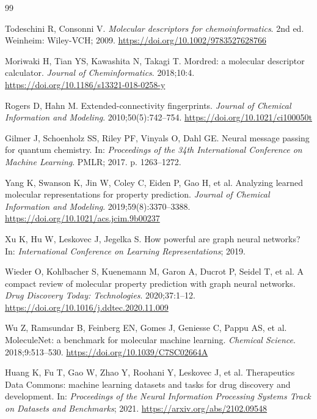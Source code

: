 ﻿\begin{thebibliography}{99}

Todeschini R, Consonni V. \emph{Molecular descriptors for chemoinformatics}. 2nd ed. Weinheim: Wiley-VCH; 2009. \url{https://doi.org/10.1002/9783527628766}

Moriwaki H, Tian YS, Kawashita N, Takagi T. Mordred: a molecular descriptor calculator. \emph{Journal of Cheminformatics}. 2018;10:4. \url{https://doi.org/10.1186/s13321-018-0258-y}

Rogers D, Hahn M. Extended-connectivity fingerprints. \emph{Journal of Chemical Information and Modeling}. 2010;50(5):742--754. \url{https://doi.org/10.1021/ci100050t}

Gilmer J, Schoenholz SS, Riley PF, Vinyals O, Dahl GE. Neural message passing for quantum chemistry. In: \emph{Proceedings of the 34th International Conference on Machine Learning}. PMLR; 2017. p. 1263--1272.

Yang K, Swanson K, Jin W, Coley C, Eiden P, Gao H, et al. Analyzing learned molecular representations for property prediction. \emph{Journal of Chemical Information and Modeling}. 2019;59(8):3370--3388. \url{https://doi.org/10.1021/acs.jcim.9b00237}

Xu K, Hu W, Leskovec J, Jegelka S. How powerful are graph neural networks? In: \emph{International Conference on Learning Representations}; 2019.

Wieder O, Kohlbacher S, Kuenemann M, Garon A, Ducrot P, Seidel T, et al. A compact review of molecular property prediction with graph neural networks. \emph{Drug Discovery Today: Technologies}. 2020;37:1--12. \url{https://doi.org/10.1016/j.ddtec.2020.11.009}

Wu Z, Ramsundar B, Feinberg EN, Gomes J, Geniesse C, Pappu AS, et al. MoleculeNet: a benchmark for molecular machine learning. \emph{Chemical Science}. 2018;9:513--530. \url{https://doi.org/10.1039/C7SC02664A}

Huang K, Fu T, Gao W, Zhao Y, Roohani Y, Leskovec J, et al. Therapeutics Data Commons: machine learning datasets and tasks for drug discovery and development. In: \emph{Proceedings of the Neural Information Processing Systems Track on Datasets and Benchmarks}; 2021. \url{https://arxiv.org/abs/2102.09548}


\end{thebibliography}
